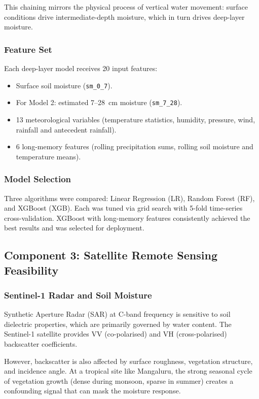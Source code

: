 \documentclass[12pt, a4paper]{article}
\begin{document}
This chaining mirrors the physical process of vertical water movement: surface conditions drive intermediate-depth moisture, which in turn drives deep-layer moisture.

\subsubsection{Feature Set}

Each deep-layer model receives 20 input features:

\begin{itemize}
    \item Surface soil moisture (\texttt{sm\_0\_7}).
    \item For Model 2: estimated 7--28~cm moisture (\texttt{sm\_7\_28}).
    \item 13 meteorological variables (temperature statistics, humidity, pressure, wind, rainfall and antecedent rainfall).
    \item 6 long-memory features (rolling precipitation sums, rolling soil moisture and temperature means).
\end{itemize}

\subsubsection{Model Selection}

Three algorithms were compared: Linear Regression (LR), Random Forest (RF), and XGBoost (XGB). Each was tuned via grid search with 5-fold time-series cross-validation. XGBoost with long-memory features consistently achieved the best results and was selected for deployment.

\subsection{Component 3: Satellite Remote Sensing Feasibility}

\subsubsection{Sentinel-1 Radar and Soil Moisture}

Synthetic Aperture Radar (SAR) at C-band frequency is sensitive to soil dielectric properties, which are primarily governed by water content. The Sentinel-1 satellite provides VV (co-polarised) and VH (cross-polarised) backscatter coefficients.

However, backscatter is also affected by surface roughness, vegetation structure, and incidence angle. At a tropical site like Mangaluru, the strong seasonal cycle of vegetation growth (dense during monsoon, sparse in summer) creates a confounding signal that can mask the moisture response.
\end{document}
